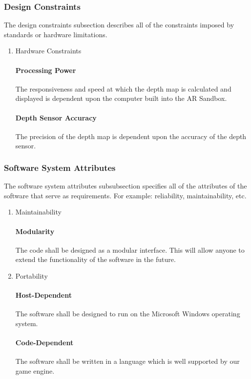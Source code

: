 \subsubsection{Design Constraints}

The design constraints subsection describes all of the constraints imposed by standards or hardware limitations.
\begin{enumerate}
\item{Hardware Constraints}
\paragraph{Processing Power}
The responsiveness and speed at which the depth map is calculated and displayed is dependent upon the computer built into the AR Sandbox. 
\paragraph{Depth Sensor Accuracy}
The precision of the depth map is dependent upon the accuracy of the depth sensor.
\end{enumerate}
\subsubsection{Software System Attributes}

The software system attributes subsubsection specifies all of the attributes of the software that serve as requirements. For example: reliability, maintainability, etc.
\begin{enumerate}
\item{Maintainability}
\paragraph{Modularity}
The code shall be designed as a modular interface. This will allow anyone to extend the functionality of the software in the future.

\item{Portability}
\paragraph{Host-Dependent}
The software shall be designed to run on the Microsoft Windows operating system.
\paragraph{Code-Dependent} 
The software shall be written in a language which is well supported by our game engine.
\end{enumerate}
